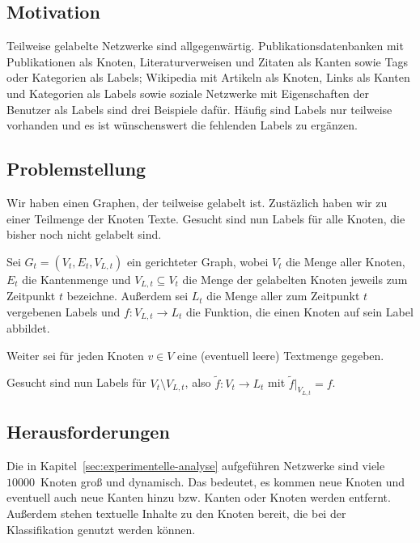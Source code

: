\subsection{Motivation}
Teilweise gelabelte Netzwerke sind allgegenwärtig. Publikationsdatenbanken
mit Publikationen als Knoten, Literaturverweisen und Zitaten als Kanten
sowie Tags oder Kategorien als Labels;
Wikipedia mit Artikeln als Knoten, Links als Kanten und Kategorien
als Labels sowie soziale Netzwerke mit Eigenschaften der Benutzer
als Labels sind drei Beispiele dafür.
Häufig sind Labels nur teilweise vorhanden und es ist wünschenswert die 
fehlenden Labels zu ergänzen. 

\subsection{Problemstellung}
Wir haben einen Graphen, der teilweise gelabelt ist. Zustäzlich haben
wir zu einer Teilmenge der Knoten Texte. Gesucht sind nun Labels
für alle Knoten, die bisher noch nicht gelabelt sind.\\

\begin{definition}[Knotenklassifierungsproblem]\label{def:Knotenklassifizierungsproblem}
    Sei $G_t = (V_t, E_t, V_{L,t})$ ein gerichteter Graph,
    wobei $V_t$ die Menge aller Knoten,
    $E_t$ die Kantenmenge und $V_{L,t} \subseteq V_t$ die Menge der 
    gelabelten Knoten jeweils zum Zeitpunkt $t$ bezeichne.
    Außerdem sei $L_t$ die Menge aller zum Zeitpunkt $t$ vergebenen
    Labels und $f:V_{L,t} \rightarrow L_t$ die Funktion, die einen
    Knoten auf sein Label abbildet.

    Weiter sei für jeden Knoten $v \in V$ eine (eventuell leere)
    Textmenge gegeben.

    Gesucht sind nun Labels für $V_t \setminus V_{L,t}$, also
    $\tilde{f}: V_t \rightarrow L_t$ mit 
    $\tilde{f}|_{V_{L,t}} = f$.
\end{definition}

\subsection{Herausforderungen}
Die in Kapitel~\ref{sec:experimentelle-analyse} aufgeführen Netzwerke 
sind viele $\num{10000}$~Knoten groß und dynamisch. Das bedeutet, es 
kommen neue Knoten und eventuell auch neue Kanten hinzu bzw. Kanten 
oder Knoten werden entfernt. Außerdem stehen textuelle Inhalte zu den 
Knoten bereit, die bei der Klassifikation genutzt werden können.
